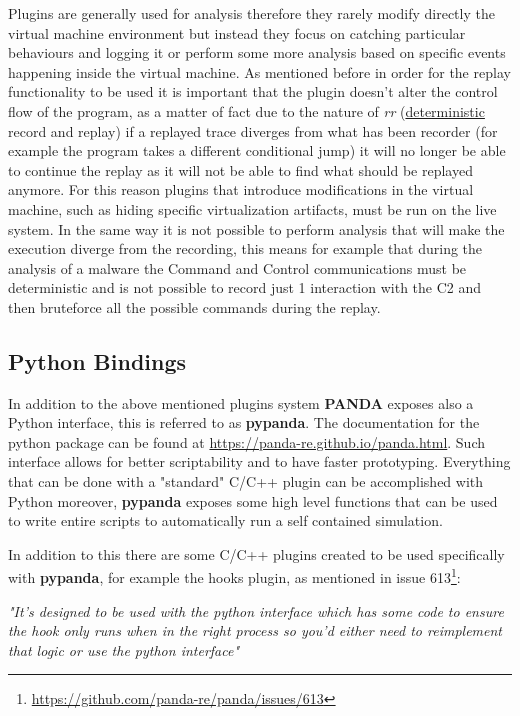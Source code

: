 Plugins are generally used for analysis therefore they rarely modify directly the virtual machine environment but instead they focus on catching particular behaviours and logging it or perform some more analysis based on specific events happening inside the virtual machine. As mentioned before in order for the replay functionality to be used it is important that the plugin doesn't alter the control flow of the program, as a matter of fact due to the nature of \textit{rr} (\underline{deterministic} record and replay) if a replayed trace diverges from what has been recorder (for example the program takes a different conditional jump) it will no longer be able to continue the replay as it will not be able to find what should be replayed anymore. For this reason plugins that introduce modifications in the virtual machine, such as hiding specific virtualization artifacts, must be run on the live system. In the same way it is not possible to perform analysis that will make the execution diverge from the recording, this means for example that during the analysis of a malware the Command and Control communications must be deterministic and is not possible to record just 1 interaction with the C2 and then bruteforce all the possible commands during the replay.


\subsection{Python Bindings}

In addition to the above mentioned plugins system \textbf{PANDA} exposes also a Python interface, this is referred to as \textbf{pypanda}. The documentation for the python package can be found at \url{https://panda-re.github.io/panda.html}. Such interface allows for better scriptability and to have faster prototyping. Everything that can be done with a "standard" C/C++ plugin can be accomplished with Python moreover, \textbf{pypanda} exposes some high level functions that can be used to write entire scripts to automatically run a self contained simulation.

In addition to this there are some C/C++ plugins created to be used specifically with \textbf{pypanda}, for example the hooks plugin, as mentioned in issue 613\footnote{\url{https://github.com/panda-re/panda/issues/613}}:

\textit{"It's designed to be used with the python interface which has some code to ensure the hook only runs when in the right process so you'd either need to reimplement that logic or use the python interface"}

